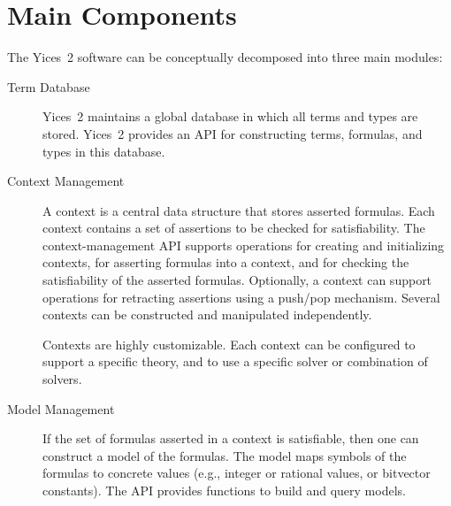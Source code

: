 \documentclass[11pt,twoside,fleqn,openright,titlepage]{cslreport}
\begin{document}
\section{Main Components}

The Yices~2  software can be  conceptually decomposed into  three main
modules:
\begin{description}
\item[Term Database] Yices~2 maintains  a global database in which all
  terms and types are stored. Yices~2 provides an API for constructing
  terms, formulas, and types in this database.

\item[Context Management] A  context is a central  data structure that
  stores asserted formulas. Each context  contains a set of assertions
  to  be  checked  for  satisfiability.   The  context-management  API
  supports  operations for  creating  and  initializing contexts,  for
  asserting   formulas  into   a   context,  and   for  checking   the
  satisfiability of the asserted  formulas.  Optionally, a context can
  support  operations  for  retracting  assertions  using  a  push/pop
  mechanism.  Several  contexts  can be  constructed  and  manipulated
  independently.

  Contexts are highly customizable.  Each context can be configured to
  support  a  specific  theory,  and  to  use  a  specific  solver  or
  combination of solvers.

\item[Model Management] If  the set of formulas asserted  in a context
  is satisfiable, then one can construct  a model of the formulas. The
  model maps symbols of the formulas to concrete values (e.g., integer
  or  rational  values, or  bitvector  constants).   The API  provides
  functions to build and query models.
\end{description}
\end{document}
